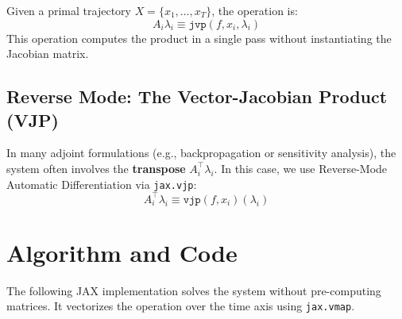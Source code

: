 \documentclass{article}
\begin{document}
Given a primal trajectory $X = \{x_1, \dots, x_T\}$, the operation is:
\begin{equation}
    A_i \lambda_i \equiv \texttt{jvp}(f, x_i, \lambda_i)
\end{equation}
This operation computes the product in a single pass without instantiating the Jacobian matrix.

\subsection{Reverse Mode: The Vector-Jacobian Product (VJP)}
In many adjoint formulations (e.g., backpropagation or sensitivity analysis), the system often involves the \textbf{transpose} $A_i^\top \lambda_i$. In this case, we use Reverse-Mode Automatic Differentiation via \texttt{jax.vjp}:
\begin{equation}
    A_i^\top \lambda_i \equiv \texttt{vjp}(f, x_i)(\lambda_i)
\end{equation}

\section{Algorithm and Code}

The following JAX implementation solves the system without pre-computing matrices. It vectorizes the operation over the time axis using \texttt{jax.vmap}.
\end{document}
